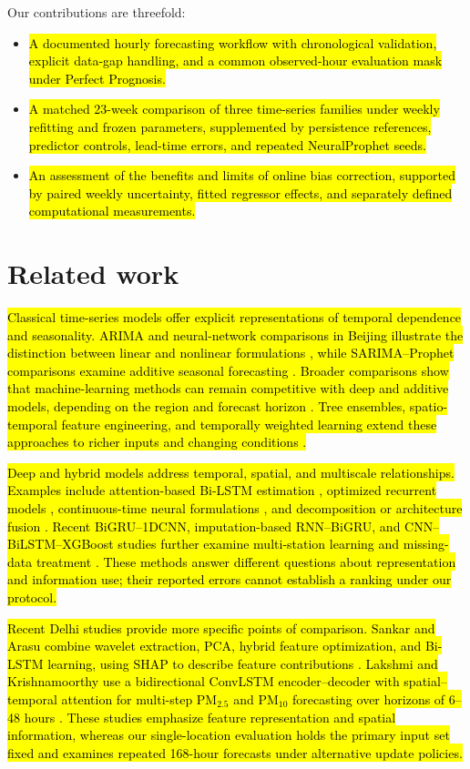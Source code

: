 \documentclass[pdflatex,sn-basic,Numbered]{sn-jnl}
\newcommand{\rev}[1]{\hl{#1}}
\begin{document}
Our contributions are threefold:
\begin{itemize}
\item \rev{A documented hourly forecasting workflow with chronological validation, explicit data-gap handling, and a common observed-hour evaluation mask under Perfect Prognosis.}
\item \rev{A matched 23-week comparison of three time-series families under weekly refitting and frozen parameters, supplemented by persistence references, predictor controls, lead-time errors, and repeated NeuralProphet seeds.}
\item \rev{An assessment of the benefits and limits of online bias correction, supported by paired weekly uncertainty, fitted regressor effects, and separately defined computational measurements.}
\end{itemize}

\section{Related work}

\rev{Classical time-series models offer explicit representations of temporal dependence and seasonality. ARIMA and neural-network comparisons in Beijing illustrate the distinction between linear and nonlinear formulations \citep{bib13}, while SARIMA--Prophet comparisons examine additive seasonal forecasting \citep{bib14}. Broader comparisons show that machine-learning methods can remain competitive with deep and additive models, depending on the region and forecast horizon \citep{bib15,bib16}. Tree ensembles, spatio-temporal feature engineering, and temporally weighted learning extend these approaches to richer inputs and changing conditions \citep{bib17,bib18,bib19,bib21}.}

\rev{Deep and hybrid models address temporal, spatial, and multiscale relationships. Examples include attention-based Bi-LSTM estimation \citep{bib22}, optimized recurrent models \citep{bib23}, continuous-time neural formulations \citep{bib24}, and decomposition or architecture fusion \citep{bib7,bib27,bib28}. Recent BiGRU--1DCNN, imputation-based RNN--BiGRU, and CNN--BiLSTM--XGBoost studies further examine multi-station learning and missing-data treatment \citep{bibr1-1,bibr1-2,bibr1-3}. These methods answer different questions about representation and information use; their reported errors cannot establish a ranking under our protocol.}

\rev{Recent Delhi studies provide more specific points of comparison. Sankar and Arasu combine wavelet extraction, PCA, hybrid feature optimization, and Bi-LSTM learning, using SHAP to describe feature contributions \citep{revWavelet}. Lakshmi and Krishnamoorthy use a bidirectional ConvLSTM encoder--decoder with spatial--temporal attention for multi-step PM$_{2.5}$ and PM$_{10}$ forecasting over horizons of 6--48 hours \citep{revSTA}. These studies emphasize feature representation and spatial information, whereas our single-location evaluation holds the primary input set fixed and examines repeated 168-hour forecasts under alternative update policies.}
\end{document}
